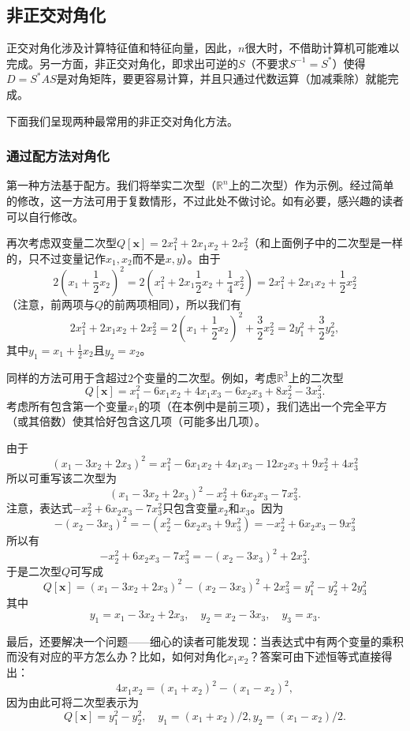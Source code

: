 \subsection{非正交对角化}\label{subsec:diag_row_column_operation}

正交对角化涉及计算特征值和特征向量，因此，$n$很大时，不借助计算机可能难以完成。另一方面，非正交对角化，即求出可逆的$S$（不要求$S^{-1}=S^*$）使得$D=S^*AS$是对角矩阵，要更容易计算，并且只通过代数运算（加减乘除）就能完成。

下面我们呈现两种最常用的非正交对角化方法。

\subsubsection{通过配方法对角化}

第一种方法基于配方。我们将举实二次型（$\mathbb{R}^n$上的二次型）作为示例。经过简单的修改，这一方法可用于复数情形，不过此处不做讨论。如有必要，感兴趣的读者可以自行修改。

再次考虑双变量二次型$Q[\mathbf{x}]=2x_1^{2}+2x_1x_2+2x_2^{2}$（和上面例子中的二次型是一样的，只不过变量记作$x_1,x_2$而不是$x,y$）。由于
\[2\left(x_1+\frac{1}{2}x_2\right)^2=2\left(x_1^2+2x_1\frac{1}{2}x_2+\frac{1}{4}x_2^2\right)=2x_1^2+2x_1x_2+\frac{1}{2}x_2^2\]
（注意，前两项与$Q$的前两项相同），所以我们有
\[2x_1^2+2x_1x_2+2x_2^2=2\left(x_1+\frac{1}{2}x_2\right)^2+\frac{3}{2}x_2^2=2y_1^2+\frac{3}{2}y_2^2,\]
其中$y_1=x_1+\frac12 x_2$且$y_2=x_2$。

同样的方法可用于含超过$2$个变量的二次型。例如，考虑$\mathbb{R}^3$上的二次型
\[Q[\mathbf{x}]=x_1^2-6x_1x_2+4x_1x_3-6x_2x_3+8x_2^2-3x_3^2.\]
考虑所有包含第一个变量$x_1$的项（在本例中是前三项），我们选出一个完全平方（或其倍数）使其恰好包含这几项（可能多出几项）。

由于
\[(x_1-3x_2+2x_3)^2=x_1^2-6x_1x_2+4x_1x_3-12x_2x_3+9x_2^2+4x_3^2\]
所以可重写该二次型为
\[(x_{1}-3x_{2}+2x_{3})^{2}-x_{2}^{2}+6x_{2}x_{3}-7x_{3}^{2}.\]
注意，表达式$-x_{2}^{2}+6x_{2}x_{3}-7x_{3}^{2}$只包含变量$x_2$和$x_3$。因为
\[-(x_2-3x_3)^2=-(x_2^2-6x_2x_3+9x_3^2)=-x_2^2+6x_2x_3-9x_3^2\]
所以有\[-x_2^2+6x_2x_3-7x_3^2=-\left(x_2-3x_3\right)^2+2x_3^2.\]
于是二次型$Q$可写成\[Q[\mathbf{x}]=(x_1-3x_2+2x_3)^2-(x_2-3x_3)^2+2x_3^2=y_1^2-y_2^2+2y_3^2\]
其中\[y_1=x_1-3x_2+2x_3,\quad y_2=x_2-3x_3,\quad y_3=x_3.\]

最后，还要解决一个问题——细心的读者可能发现：当表达式中有两个变量的乘积而没有对应的平方怎么办？比如，如何对角化$x_1x_2$？答案可由下述恒等式直接得出：
\begin{equation}\label{no_square_decomp}
    4x_1x_2=(x_1+x_2)^2-(x_1-x_2)^2,
\end{equation}
因为由此可将二次型表示为
\[Q[\mathbf{x}]=y_1^2-y_2^2,\quad y_1=(x_1+x_2)/2,y_2=(x_1-x_2)/2.\]

